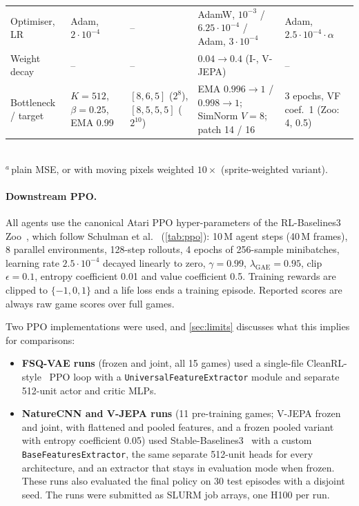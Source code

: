 \documentclass[runningheads]{llncs}
\begin{document}
\begin{table}[t]
\begin{tabular}{@{}Y{1.6cm}Y{2.25cm}Y{2.2cm}Y{2.95cm}Y{2.25cm}@{}}
Optimiser, LR & Adam, $2{\cdot}10^{-4}$ & -- & AdamW, $10^{-3}$ / $6.25{\cdot}10^{-4}$ / Adam, $3{\cdot}10^{-4}$ &
  Adam, $2.5{\cdot}10^{-4}\cdot\alpha$ \\
Weight decay & -- & -- & $0.04\to0.4$ (I-, V-JEPA) & -- \\
Bottleneck / target & $K{=}512$, $\beta{=}0.25$, EMA 0.99 & $[8,6,5]$ ($2^8$), $[8,5,5,5]$ ($2^{10}$) &
  EMA $0.996\to1$ / $0.998\to1$; SimNorm $V{=}8$; patch 14 / 16 & 3 epochs, VF coef.\ 1 (Zoo: 4, 0.5) \\
\bottomrule
\end{tabular}\\[2pt]
{\scriptsize $^{a}$\,plain MSE, or with moving pixels weighted $10\times$ (sprite-weighted variant).}
\end{table}

\paragraph{Downstream PPO.}
All agents use the canonical Atari PPO hyper-parameters of the RL-Baselines3
Zoo~\cite{raffin2020zoo}, which follow Schulman et al.~\cite{schulman2017ppo}
(\cref{tab:ppo}): 10\,M agent steps (40\,M frames), 8 parallel environments, 128-step
rollouts, 4 epochs of 256-sample minibatches, learning rate $2.5\cdot10^{-4}$ decayed
linearly to zero, $\gamma=0.99$, $\lambda_{\text{GAE}}=0.95$, clip $\epsilon=0.1$,
entropy coefficient 0.01 and value coefficient 0.5. Training rewards are clipped to
$\{-1,0,1\}$ and a life loss ends a training episode. Reported scores are always raw game
scores over full games.

Two PPO implementations were used, and \cref{sec:limits} discusses what this implies
for comparisons:
\begin{itemize}
  \item \textbf{FSQ-VAE runs} (frozen and joint, all 15 games) used a single-file
  CleanRL-style~\cite{huang2022cleanrl} PPO loop with a \texttt{UniversalFeatureExtractor}
  module and separate 512-unit actor and critic MLPs.
  \item \textbf{NatureCNN and V-JEPA runs} (11 pre-training games; V-JEPA frozen and
  joint, with flattened and pooled features, and a frozen pooled variant with entropy
  coefficient 0.05) used Stable-Baselines3~\cite{raffin2021sb3} with a custom
  \texttt{BaseFeaturesExtractor}, the same separate 512-unit heads for every
  architecture, and an extractor that stays in evaluation mode when frozen. These runs
  also evaluated the final policy on 30 test episodes with a disjoint seed. The runs were
  submitted as SLURM job arrays, one H100 per run.
\end{itemize}
\end{document}
